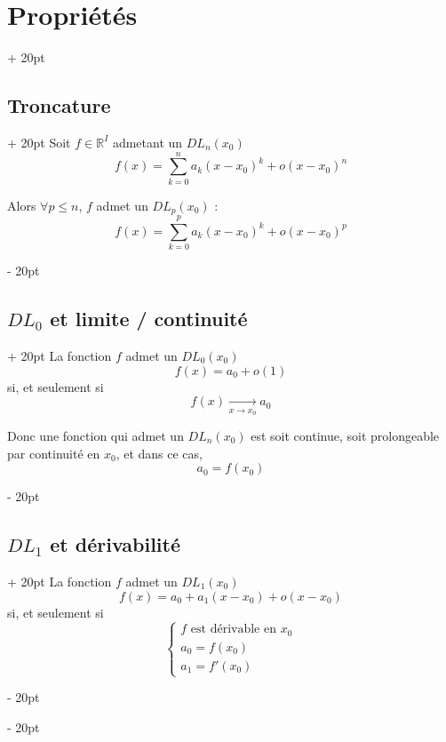 \documentclass[a4paper, 12pt, twoside]{article}
\newcommand{\R}{\mathbb{R}} %
\newcommand{\tendsto}[1]{\xrightarrow[#1]{}}
\renewcommand{\le}{\leqslant}
\newcommand{\ind}[1][20pt]{\advance\leftskip + #1}
\newcommand{\deind}[1][20pt]{\advance\leftskip - #1}
\newenvironment{indt}[2][20pt]{#2 \par \ind[#1]}{\par \deind} %
\begin{document}
    \begin{indt}{\section{Propriétés}}
        
        \begin{indt}{\subsection{Troncature}}
            Soit $f \in \R^I$ admetant un $DL_n(x_0)$
                \[ f(x) = \sum_{k = 0}^n a_k (x - x_0)^k + o(x - x_0)^n \]
            
            Alors $\forall p \le n$, $f$ admet un $DL_p(x_0)$ :
                \[ f(x) = \sum_{k = 0}^p a_k (x - x_0)^k + o(x - x_0)^p \]
        \end{indt}
        
        \vspace{12pt}
        
        \begin{indt}{\subsection{$DL_0$ et limite / continuité}}
            La fonction $f$ admet un $DL_0(x_0)$
                \[f(x) = a_0 + o(1) \]
            si, et seulement si
                \[ f(x) \tendsto{x \to x_0} a_0 \]
            
            Donc une fonction qui admet un $DL_n(x_0)$ est soit continue, soit prolongeable par continuité en $x_0$, et dans ce cas,
                \[ a_0 = f(x_0) \]
        \end{indt}
        
        \vspace{12pt}
        
        \begin{indt}{\subsection{$DL_1$ et dérivabilité}}
            La fonction $f$ admet un $DL_1(x_0)$
                \[ f(x) = a_0 + a_1 (x - x_0) + o(x - x_0) \]
            si, et seulement si
                \[ 
                    \begin{cases}
                        \text{$f$ est dérivable en $x_0$}
                        \\
                        a_0 = f(x_0)
                        \\
                        a_1 = f'(x_0)
                    \end{cases}
                \]
        \end{indt}
        

\end{indt}
\end{document}
